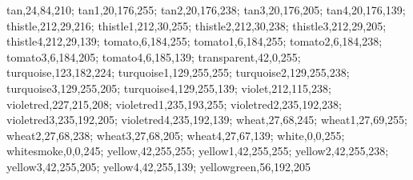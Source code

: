 {tan,24,84,210;%
tan1,20,176,255;%
tan2,20,176,238;%
tan3,20,176,205;%
tan4,20,176,139;%
thistle,212,29,216;%
thistle1,212,30,255;%
thistle2,212,30,238;%
thistle3,212,29,205;%
thistle4,212,29,139;%
tomato,6,184,255;%
tomato1,6,184,255;%
tomato2,6,184,238;%
tomato3,6,184,205;%
tomato4,6,185,139;%
transparent,42,0,255;%
turquoise,123,182,224;%
turquoise1,129,255,255;%
turquoise2,129,255,238;%
turquoise3,129,255,205;%
turquoise4,129,255,139;%
violet,212,115,238;%
violetred,227,215,208;%
violetred1,235,193,255;%
violetred2,235,192,238;%
violetred3,235,192,205;%
violetred4,235,192,139;%
wheat,27,68,245;%
wheat1,27,69,255;%
wheat2,27,68,238;%
wheat3,27,68,205;%
wheat4,27,67,139;%
white,0,0,255;%
whitesmoke,0,0,245;%
yellow,42,255,255;%
yellow1,42,255,255;%
yellow2,42,255,238;%
yellow3,42,255,205;%
yellow4,42,255,139;%
yellowgreen,56,192,205}